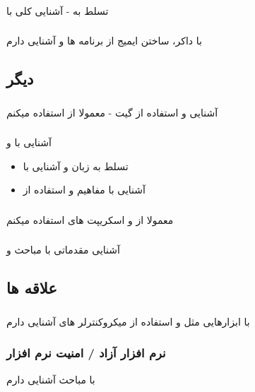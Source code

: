 \documentclass{article}
\begin{document}
\subsubsection{}
تسلط به   -  آشنایی کلی با 
\subsubsection{}
با داکر، ساختن ایمیج از برنامه ها و
 آشنایی دارم 
\subsection{دیگر}
\subsubsection{}
آشنایی و استفاده از گیت - معمولا از  استفاده میکنم
\subsubsection{}
آشنایی با  و 
\begin{itemize}
\item تسلط به زبان   و آشنایی با  
\item آشنایی با مفاهیم  و استفاده از 
\end{itemize}
\subsubsection{}
معمولا از  و اسکریپت های  استفاده میکنم
\subsubsection{}
آشنایی مقدماتی با مباحث  و 
\subsection{علاقه ها}
\subsubsection{}
با ابزارهایی مثل  و استفاده از میکروکنترلر های  آشنایی دارم
\subsubsection{نرم افزار آزاد / امنیت نرم افزار}
با مباحث  آشنایی دارم
\end{document}
